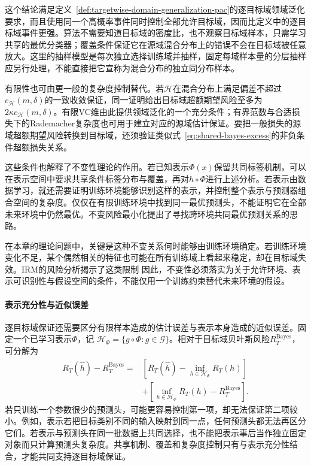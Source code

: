 这个结论满足定义~\ref{def:targetwise-domain-generalization-pac}的逐目标域领域泛化要求，而且使用同一个高概率事件同时控制全部允许目标域，因而比定义中的逐目标域事件更强。算法不需要知道目标域的密度比，也不观察目标域样本，只需学习共享的最优分类器；覆盖条件保证它在源域混合分布上的错误不会在目标域被任意放大。这里的抽样模型是每次独立选择训练域并抽样，固定每域样本量的分层抽样应另行处理，不能直接把它宣称为混合分布的独立同分布样本。

有限性也可由更一般的复杂度控制替代。若$\mathcal H$在混合分布上满足偏差不超过$c_{\mathcal H}(m,\delta)$的一致收敛保证，同一证明给出目标域超额期望风险至多为$2\kappa c_{\mathcal H}(m,\delta)$。有限VC维由此提供领域泛化的一个充分条件；有界范数与合适损失下的Rademacher复杂度也可用于建立对应的源域估计保证。要把一般损失的源域超额期望风险转换到目标域，还须验证类似式~\eqref{eq:shared-bayes-excess}的非负条件超额损失关系。

这些条件也解释了不变性理论的作用。若已知表示$\Phi(x)$保留共同标签机制，可以在表示空间中要求共享条件标签分布与覆盖，再对$h\circ\Phi$进行上述分析。若表示由数据学习，就还需要证明训练环境能够识别这样的表示，并控制整个表示与预测器组合空间的复杂度。仅仅在有限训练环境中找到同一最优预测头，不能证明它在全部未来环境中仍然最优。不变风险最小化提出了寻找跨环境共同最优预测关系的思路。

在本章的理论问题中，关键是这种不变关系何时能够由训练环境确定。若训练环境变化不足，某个偶然相关的特征也可能在所有训练域上看起来稳定，却在目标域失效。IRM的风险分析揭示了这类限制 因此，不变性必须落实为关于允许环境、表示可识别性与假设空间的条件，不能仅用一个训练约束替代未来环境的假设。

\paragraph{表示充分性与近似误差}

逐目标域保证还需要区分有限样本造成的估计误差与表示本身造成的近似误差。固定一个已学习表示$\Phi$，记
$\mathcal H_\Phi=\{g\circ\Phi:g\in\mathcal G\}$。相对于目标域贝叶斯风险$R_T^{\mathrm{Bayes}}$，可分解为
\begin{equation}
 \begin{aligned}
 R_T(\widehat h)-R_T^{\mathrm{Bayes}}
 ={}&\left[R_T(\widehat h)-\inf_{h\in\mathcal H_\Phi}R_T(h)\right]\\
 &+\left[\inf_{h\in\mathcal H_\Phi}R_T(h)-R_T^{\mathrm{Bayes}}\right].
 \end{aligned}
 \label{eq:transfer-representation-bias}
\end{equation}
若只训练一个参数很少的预测头，可能更容易控制第一项，却无法保证第二项较小。例如，表示若把目标类别不同的输入映射到同一点，任何预测头都无法再区分它们。若表示与预测头在同一批数据上共同选择，也不能把表示事后当作独立固定对象而只计算预测头复杂度。共享机制、覆盖和复杂度控制只有与表示充分性结合，才能共同支持逐目标域保证。

